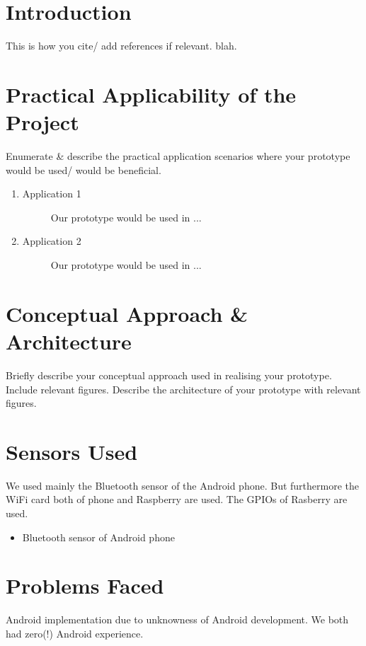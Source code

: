 \documentclass[
10pt, %
a4paper, %
oneside, %
headinclude,footinclude, %
BCOR5mm, %
]{scrartcl}
\begin{document}

\section{Introduction}
This is how you cite/ add references if relevant. blah\cite{qrygraph}.

\section{Practical Applicability of the Project}
Enumerate  \& describe  the practical application scenarios where your prototype would be used/ would be beneficial.
\begin{enumerate}
\item 
	\begin{description}
	\item[Application 1] Our prototype would be used in ...
	\end{description}
	\item 
	\begin{description}
	\item[Application 2] Our prototype would be used in ...
	\end{description}
\end{enumerate}

\section{Conceptual Approach \& Architecture}
Briefly describe your conceptual approach used in realising your prototype. Include relevant figures. Describe the architecture of your prototype with relevant figures.

\section{Sensors Used}
We used mainly the Bluetooth sensor of the Android phone. But furthermore the WiFi card both of phone and Raspberry are used. The GPIOs of Rasberry are used.

\begin{itemize}
\item Bluetooth sensor of Android phone
\end{itemize}


\section{Problems Faced}
Android implementation due to unknowness of Android development. We both had zero(!) Android experience.
\end{document}
